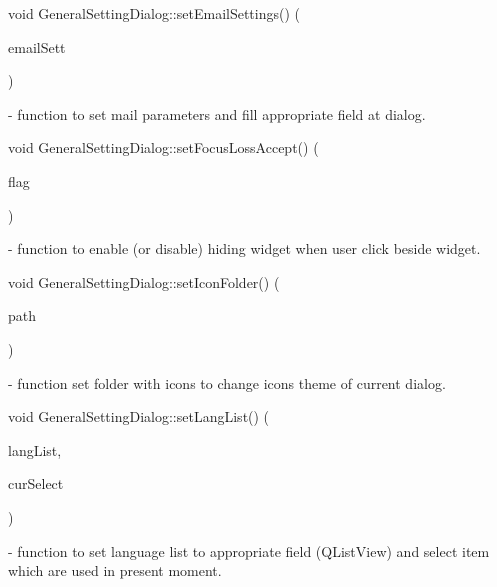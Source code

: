\mbox{\label{classGeneralSettingDialog_a418a131dbac78536218003bafc7988ae}} 
{\footnotesize\ttfamily void General\+Setting\+Dialog\+::\texorpdfstring{set\+Email\+Settings()}{setEmailSettings()} (\begin{DoxyParamCaption}\item[{\mbox{\hyperlink{structEmailSettings}{Email\+Settings}}}]{email\+Sett }\end{DoxyParamCaption})} - function to set mail parameters and fill appropriate field at dialog.

\mbox{\label{classGeneralSettingDialog_a43d51bbc0d1681b933c9c630c08e88fa}} 
{\footnotesize\ttfamily void General\+Setting\+Dialog\+::\texorpdfstring{set\+Focus\+Loss\+Accept()}{setFocusLossAccept()} (\begin{DoxyParamCaption}\item[{bool}]{flag }\end{DoxyParamCaption})} - function to enable (or disable) hiding widget when user click beside widget.

\mbox{\label{classGeneralSettingDialog_ab9ca0f722e745c5cbf9d35c0307a2740}} 
{\footnotesize\ttfamily void General\+Setting\+Dialog\+::\texorpdfstring{set\+Icon\+Folder()}{setIconFolder()} (\begin{DoxyParamCaption}\item[{Q\+String}]{path }\end{DoxyParamCaption})} - function set folder with icons to change icons theme of current dialog.

\mbox{\label{classGeneralSettingDialog_a6ba230057e081886f781539e4464ba99}} 
{\footnotesize\ttfamily void General\+Setting\+Dialog\+::\texorpdfstring{set\+Lang\+List()}{setLangList()} (\begin{DoxyParamCaption}\item[{Q\+String\+List}]{lang\+List,  }\item[{int}]{cur\+Select }\end{DoxyParamCaption})} - function to set language list to appropriate field (Q\+List\+View) and select item which are used in present moment.

